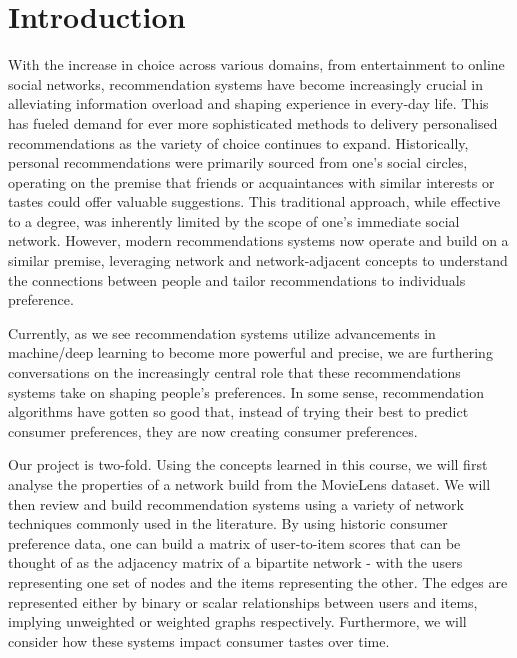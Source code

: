 \documentclass[12pt]{article}
\numberwithin{equation}{section}
\begin{document}
\vspace{1cm}
\pagebreak

\newpage

\section{Introduction}

With the increase in choice across various domains, from entertainment to online social networks, recommendation systems have become increasingly crucial in alleviating information overload and shaping experience in every-day life. This has fueled demand for ever more sophisticated methods to delivery personalised recommendations as the variety of choice continues to expand. Historically, personal recommendations were primarily sourced from one's social circles, operating on the premise that friends or acquaintances with similar interests or tastes could offer valuable suggestions. This traditional approach, while effective to a degree, was inherently limited by the scope of one's immediate social network. However, modern recommendations systems now operate and build on a similar premise, leveraging network and network-adjacent concepts to understand the connections between people and tailor recommendations to individuals preference.

Currently, as we see recommendation systems utilize advancements in machine/deep learning to become more powerful and precise, we are furthering conversations on the increasingly central role that these recommendations systems take on shaping people's preferences. In some sense, recommendation algorithms have gotten so good that, instead of trying their best to predict consumer preferences, they are now creating consumer preferences. 

Our project is two-fold. Using the concepts learned in this course, we will first analyse the properties of a network build from the MovieLens dataset. We will then review and build recommendation systems using a variety of network techniques commonly used in the literature. By using historic consumer preference data, one can build a matrix of user-to-item scores that can be thought of as the adjacency matrix of a bipartite network - with the users representing one set of nodes and the items representing the other. The edges are represented either by binary or scalar relationships between users and items, implying unweighted or weighted graphs respectively. Furthermore, we will consider how these systems impact consumer tastes over time.
\end{document}
